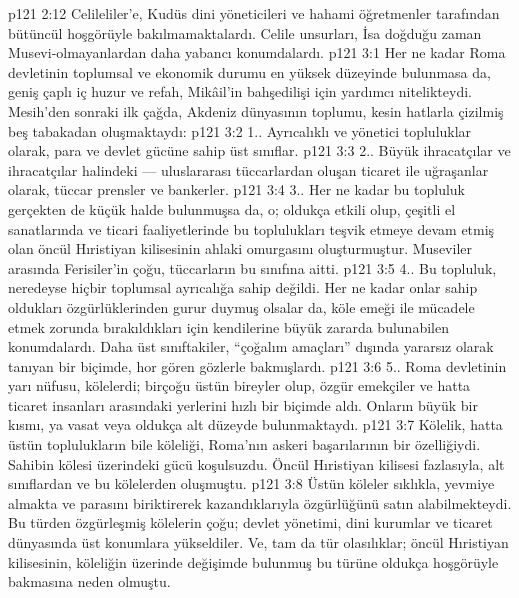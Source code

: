 \vs p121 2:12 Celileliler’e, Kudüs dini yöneticileri ve hahami öğretmenler tarafından bütüncül hoşgörüyle bakılmamaktalardı. Celile unsurları, İsa doğduğu zaman Musevi\hyp{}olmayanlardan daha yabancı konumdalardı.
\vs p121 3:1 Her ne kadar Roma devletinin toplumsal ve ekonomik durumu en yüksek düzeyinde bulunmasa da, geniş çaplı iç huzur ve refah, Mikâil’in bahşedilişi için yardımcı nitelikteydi. Mesih’den sonraki ilk çağda, Akdeniz dünyasının toplumu, kesin hatlarla çizilmiş beş tabakadan oluşmaktaydı:
\vs p121 3:2 1.\bibnobreakspace {}. Ayrıcalıklı ve yönetici topluluklar olarak, para ve devlet gücüne sahip üst sınıflar.
\vs p121 3:3 2.\bibnobreakspace {}. Büyük ihracatçılar ve ihracatçılar halindeki --- uluslararası tüccarlardan oluşan ticaret ile uğraşanlar olarak, tüccar prensler ve bankerler.
\vs p121 3:4 3.\bibnobreakspace {}. Her ne kadar bu topluluk gerçekten de küçük halde bulunmuşsa da, o; oldukça etkili olup, çeşitli el sanatlarında ve ticari faaliyetlerinde bu toplulukları teşvik etmeye devam etmiş olan öncül Hıristiyan kilisesinin ahlaki omurgasını oluşturmuştur. Museviler arasında Ferisiler’in çoğu, tüccarların bu sınıfına aitti.
\vs p121 3:5 4.\bibnobreakspace {}. Bu topluluk, neredeyse hiçbir toplumsal ayrıcalığa sahip değildi. Her ne kadar onlar sahip oldukları özgürlüklerinden gurur duymuş olsalar da, köle emeği ile mücadele etmek zorunda bırakıldıkları için kendilerine büyük zararda bulunabilen konumdalardı. Daha üst sınıftakiler, “çoğalım amaçları” dışında yararsız olarak tanıyan bir biçimde, hor gören gözlerle bakmışlardı.
\vs p121 3:6 5.\bibnobreakspace {}. Roma devletinin yarı nüfusu, kölelerdi; birçoğu üstün bireyler olup, özgür emekçiler ve hatta ticaret insanları arasındaki yerlerini hızlı bir biçimde aldı. Onların büyük bir kısmı, ya vasat veya oldukça alt düzeyde bulunmaktaydı.
\vs p121 3:7 Kölelik, hatta üstün toplulukların bile köleliği, Roma’nın askeri başarılarının bir özelliğiydi. Sahibin kölesi üzerindeki gücü koşulsuzdu. Öncül Hıristiyan kilisesi fazlasıyla, alt sınıflardan ve bu kölelerden oluşmuştu.
\vs p121 3:8 Üstün köleler sıklıkla, yevmiye almakta ve parasını biriktirerek kazandıklarıyla özgürlüğünü satın alabilmekteydi. Bu türden özgürleşmiş kölelerin çoğu; devlet yönetimi, dini kurumlar ve ticaret dünyasında üst konumlara yükseldiler. Ve, tam da tür olasılıklar; öncül Hıristiyan kilisesinin, köleliğin üzerinde değişimde bulunmuş bu türüne oldukça hoşgörüyle bakmasına neden olmuştu.
